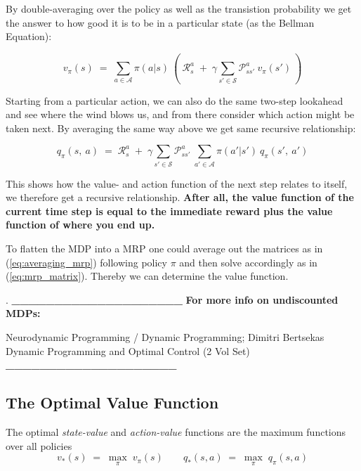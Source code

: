 \documentclass[10pt]{article}
\begin{document}
By double-averaging over the policy as well as the transistion probability we get the answer to how good it is to be in a particular state (as the Bellman Equation):

\begin{equation}
v_{\pi}(s)\;=\;\sum_{a \in \mathcal{A}} \pi(a|s)\: \left( \: \mathcal{R}_{s}^{a}\;+\;\gamma \sum_{s' \in \mathcal{S}} \mathcal{P}_{ss'}^{a}\:v_{\pi}(s') \: \right)
\label{eq:v_pi_be}
\end{equation}

Starting from a particular action, we can also do the same two-step lookahead and see where the wind blows us, and from there consider which action might be taken next. By averaging the same way above we get same recursive relationship:

\begin{equation}
q_{\pi}(s,\:a)\;=\;\mathcal{R}_{s}^{a}\;+\;\gamma \sum_{s' \in \mathcal{S}} \mathcal{P}_{ss'}^{a}\: \sum_{a' \in \mathcal{A}} \pi(a'|s')\:q_{\pi}(s',\:a')
\end{equation}

This shows how the value- and action function of the next step relates to itself, we therefore get a recursive relationship. \textbf{After  all, the value function of the current time step is equal to the immediate reward plus the value function of where you end up.}


To flatten the MDP into a MRP one could average out the matrices as in (\ref{eq:averaging_mrp}) following policy $\pi$ and then solve accordingly as in (\ref{eq:mrp_matrix}). Thereby we can determine the value function.

.\newline
\textbf{\_\_\_\_\_\_\_\_\_\_\_\_\_\_\_\_\_\_\_\_}
\textbf{For more info on undiscounted MDPs:}

Neurodynamic Programming / Dynamic Programming;
Dimitri Bertsekas Dynamic Programming and Optimal Control (2 Vol Set)
\textbf{\_\_\_\_\_\_\_\_\_\_\_\_\_\_\_\_\_\_\_\_} \newline

\subsection{The Optimal Value Function}
The optimal \textit{state-value} and \textit{action-value} functions are the maximum functions over all policies
\begin{equation}
v_{*}(s)\;=\;\mathop{max}_{\pi} \; v_{\pi}(s) \qquad q_{*}(s,a)\;=\;\mathop{max}_{\pi} \; q_{\pi}(s, a)
\end{equation}
\end{document}
